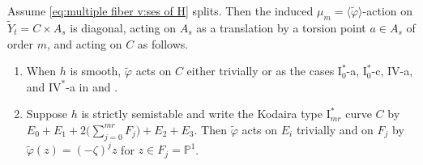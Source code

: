 \documentclass[reqno, letterpaper]{amsart}
\numberwithin{equation}{subsection}
\newcommand{\PP}{\mathbb{P}}
\begin{document}
		\begin{corollary} \label{cor:multiple fiber v:classification of varphi}
			Assume \eqref{eq:multiple fiber v:ses of H} splits. Then the induced $\mu_m = \langle \tilde \varphi \rangle$-action on $\tilde Y_t = C \times A_s$ is diagonal, acting on $A_s$ as a translation by a torsion point $a \in A_s$ of order $m$, and acting on $C$ as follows.
			\begin{enumerate}
				\item When $h$ is smooth, $\tilde \varphi$ acts on $C$ either trivially or as the cases $\mathrm I_0^*$-a, $\mathrm I_0^*$-c, $\mathrm{IV}$-a, and $\mathrm{IV}^*$-a in  and .
				\item Suppose $h$ is strictly semistable and write the Kodaira type $\mathrm I_{mr}^*$ curve $C$ by $E_0 + E_1 + 2 \big( \sum_{j=0}^{mr} F_j \big) + E_2 + E_3$. Then $\tilde \varphi$ acts on $E_i$ trivially and on $F_j$ by $\tilde \varphi (z) = (-\zeta)^j z$ for $z \in F_j = \PP^1$.
			\end{enumerate}
		\end{corollary}
\end{document}
